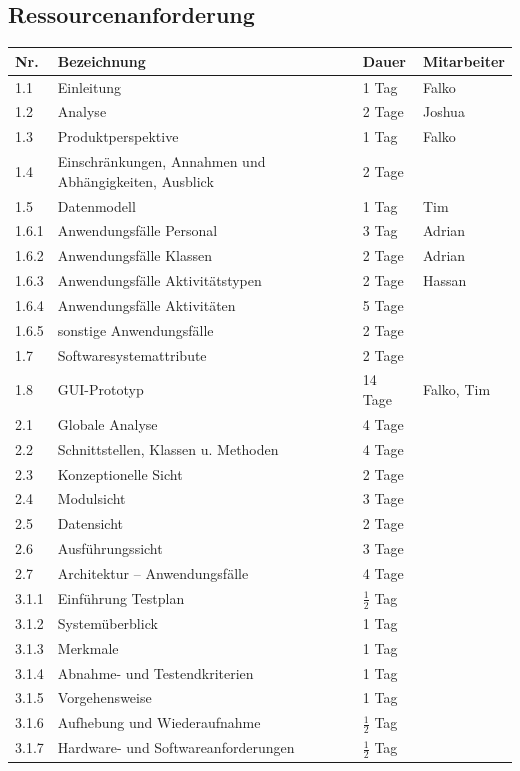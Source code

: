 \documentclass[fontsize=12pt,paper=a4,twoside]{scrartcl}
\begin{document}
\subsection{Ressourcenanforderung}

\begin{tabularx}{\textwidth}{|p{1cm}|p{5.5cm}|p{2cm}|X|}
\hline \textbf{Nr.} &\textbf{Bezeichnung} & \textbf{Dauer} & \textbf{Mitarbeiter} \\
\hline 		1.1		& Einleitung							&	1 Tag		& Falko\\
\hline 		1.2 	& Analyse		                		&	2 Tage		& Joshua\\
\hline 		1.3		& Produktperspektive					&	1 Tag		& Falko\\
\hline 		1.4		& Einschränkungen, Annahmen und Abhängigkeiten, Ausblick & 2 Tage &\\
\hline 		1.5 	& Datenmodell	                		&   1 Tag       & Tim\\
\hline 		1.6.1 	& Anwendungsfälle Personal      		&   3 Tag	    & Adrian \\
\hline 		1.6.2 	& Anwendungsfälle Klassen       		&   2 Tage      & Adrian \\
\hline 		1.6.3 	& Anwendungsfälle Aktivitätstypen		&	2 Tage		& Hassan \\
\hline 		1.6.4 	& Anwendungsfälle Aktivitäten			&	5 Tage		&  \\
\hline 		1.6.5	& sonstige Anwendungsfälle      		&	2 Tage		&  \\
\hline 		1.7		& Softwaresystemattribute       		&	2 Tage	    &  \\
\hline 		1.8 	& GUI-Prototyp                  		&	14 Tage		& Falko, Tim \\
\hline		2.1		& Globale Analyse						&	4 Tage		&  \\
\hline 		2.2		& Schnittstellen, Klassen u. Methoden 	& 	4 Tage		&  \\
\hline 		2.3		& Konzeptionelle Sicht					& 	2 Tage		&  \\
\hline		2.4		& Modulsicht							&   3 Tage		&  \\
\hline 		2.5		& Datensicht							& 	2 Tage		&  \\
\hline 		2.6		& Ausführungssicht						& 	3 Tage		&  \\
\hline		2.7		& Architektur -- Anwendungsfälle		&	4 Tage		&	\\
\hline		3.1.1	& Einführung Testplan					& $\frac{1}{2}$ Tag & \\
\hline 		3.1.2	& Systemüberblick						&   1 Tag		&  \\
\hline 		3.1.3	& Merkmale								&	1 Tag		&	\\
\hline 		3.1.4	& Abnahme- und Testendkriterien			&	1 Tag		&	\\
\hline 		3.1.5	& Vorgehensweise						&	1 Tag		&	\\
\hline 		3.1.6	& Aufhebung und Wiederaufnahme			& $\frac{1}{2}$ Tag	&	\\
\hline 		3.1.7	& Hardware- und Softwareanforderungen	&$\frac{1}{2}$ Tag	&	\\
\hline
\end{tabularx}\clearpage
\end{document}
